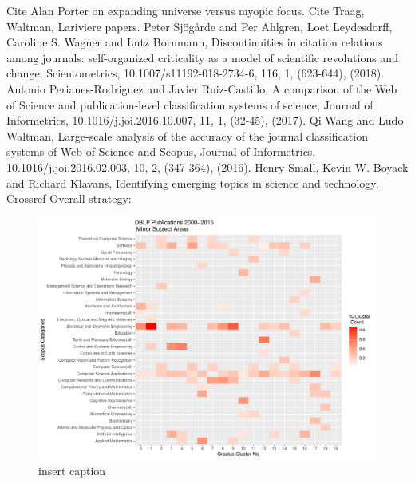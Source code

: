 Cite Alan Porter on expanding universe versus myopic focus. Cite Traag, Waltman, Lariviere papers. Peter Sjögårde and Per Ahlgren, Loet Leydesdorff, Caroline S. Wagner and Lutz Bornmann, Discontinuities in citation relations among journals: self-organized criticality as a model of scientific revolutions and change, Scientometrics, 10.1007/s11192-018-2734-6, 116, 1, (623-644), (2018). Antonio Perianes-Rodriguez and Javier Ruiz-Castillo, A comparison of the Web of Science and publication-level classification systems of science, Journal of Informetrics, 10.1016/j.joi.2016.10.007, 11, 1, (32-45), (2017). Qi Wang and Ludo Waltman, Large-scale analysis of the accuracy of the journal classification systems of Web of Science and Scopus, Journal of Informetrics, 10.1016/j.joi.2016.02.003, 10, 2, (347-364), (2016). Henry Small, Kevin W. Boyack and Richard Klavans, Identifying emerging topics in science and technology, 
Crossref
Overall strategy:

\begin{figure}[ht]
  \includegraphics[scale=0.5]{scopus_dblp_graclus2.pdf}
\caption{insert caption}
\label{heatmap}       %
\end{figure}

